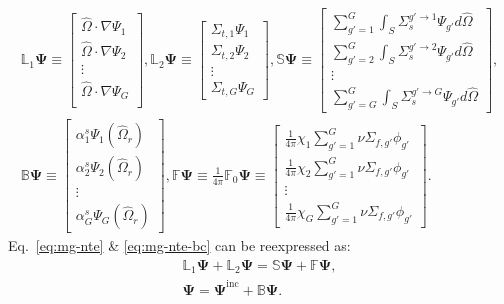 \documentclass[letterpaper]{mc2025}
\begin{document}
\begin{gather}
  \mathbb{L}_1\bm{\Psi} \equiv
  \begin{bmatrix}
    \hat{\Omega}\cdot\nabla\Psi_1 \\
    \hat{\Omega}\cdot\nabla\Psi_2 \\
    \vdots \\
    \hat{\Omega}\cdot\nabla\Psi_G \\
  \end{bmatrix},
  \mathbb{L}_2\bm{\Psi} \equiv
  \begin{bmatrix}
    \Sigma_{t,1}\Psi_1 \\
    \Sigma_{t,2}\Psi_2 \\
    \vdots \\
    \Sigma_{t,G}\Psi_G
  \end{bmatrix},
  \mathbb{S}\bm{\Psi} \equiv
  \begin{bmatrix}
    \sum^G_{g'=1}\int_S \Sigma_s^{g'\rightarrow 1}\Psi_{g'}d\hat{\Omega} \\
    \sum^G_{g'=2}\int_S \Sigma_s^{g'\rightarrow 2}\Psi_{g'}d\hat{\Omega} \\
    \vdots \\
    \sum^G_{g'=G}\int_S \Sigma_s^{g'\rightarrow G}\Psi_{g'}d\hat{\Omega}
  \end{bmatrix}, \nonumber \\
  \mathbb{B}\bm{\Psi} \equiv
  \begin{bmatrix}
    \alpha^s_1\Psi_1(\hat{\Omega}_r) \\
    \alpha^s_2\Psi_2(\hat{\Omega}_r) \\
    \vdots \\
    \alpha^s_G\Psi_G(\hat{\Omega}_r)
  \end{bmatrix},
  \mathbb{F}\bm{\Psi} \equiv \frac{1}{4\pi}\mathbb{F}_0\bm{\Psi} \equiv
  \begin{bmatrix}
    \frac{1}{4\pi}\chi_{1}\sum^G_{g'=1}\nu\Sigma_{f,g'}\phi_{g'} \\
    \frac{1}{4\pi}\chi_{2}\sum^G_{g'=1}\nu\Sigma_{f,g'}\phi_{g'} \\
    \vdots \\
    \frac{1}{4\pi}\chi_{G}\sum^G_{g'=1}\nu\Sigma_{f,g'}\phi_{g'}
  \end{bmatrix}.
\end{gather}
%
Eq.\ \ref{eq:mg-nte} \& \ref{eq:mg-nte-bc} can be reexpressed as:
%
\begin{gather}
  \mathbb{L}_1\bm{\Psi} + \mathbb{L}_2\bm{\Psi} = \mathbb{S}\bm{\Psi} + \mathbb{F}\bm{\Psi}, \label{eq:nte-vec} \\
  \bm{\Psi} = \bm{\Psi}^\text{inc} + \mathbb{B}\bm{\Psi}.
\end{gather}
\end{document}
